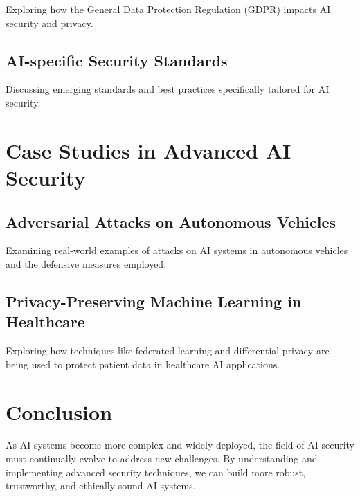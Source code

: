 \documentclass[
]{article}
\begin{document}
Exploring how the General Data Protection Regulation (GDPR) impacts AI
security and privacy.

\subsection{AI-specific Security Standards}

Discussing emerging standards and best practices specifically tailored
for AI security.

\section{Case Studies in Advanced AI Security}

\subsection{Adversarial Attacks on Autonomous Vehicles}

Examining real-world examples of attacks on AI systems in autonomous
vehicles and the defensive measures employed.

\subsection{Privacy-Preserving Machine Learning in Healthcare}

Exploring how techniques like federated learning and differential
privacy are being used to protect patient data in healthcare AI
applications.

\section{Conclusion}

As AI systems become more complex and widely deployed, the field of AI
security must continually evolve to address new challenges. By
understanding and implementing advanced security techniques, we can
build more robust, trustworthy, and ethically sound AI systems.
\end{document}
